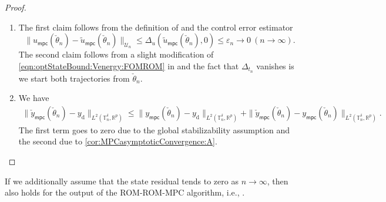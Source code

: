 \documentclass[reqno]{amsart}
\newcommand{\U}{{\mathscr U}}
\newcommand{\R}{\mathbb R}
\newcommand{\timeInt}{\mathbb{T}}
\newcommand{\state}{\theta}
\newcommand{\desired}[1]{#1_{\mathrm{d}}}
\newcommand{\inpVar}{u}
\newcommand{\outVar}{y}
\newcommand{\outVarDes}{\desired{y}}
\newcommand{\outVarDim}{p}
\newcommand{\initBound}{\initBoundn{n}}%
\newcommand{\initBoundn}[1]{\Delta_{t_{#1}}}
\newcommand{\inpVarMPC}{\inpVar_{\mathsf{mpc}}}
\newcommand{\outVarMPC}{\outVar_{\mathsf{mpc}}}
\newcommand{\reduce}[1]{\tilde{#1}}
\newcommand{\inpVarRed}{\reduce{\inpVar}}
\newcommand{\intermediateState}{\check{\state}}
\newcommand{\intermediateOutVarMPC}
{\check{\outVar}_{\mathsf{mpc}}}
\newcommand{\inpVarRedMPC}{\inpVarRed_{\mathsf{mpc}}}
\newcommand{\abbr}[1]{\textsf{#1}\xspace}
\newcommand{\ROM}{\abbr{ROM}}
\newcommand{\MPC}{\abbr{MPC}}
\begin{document}
\begin{proof}\, 
    \begin{enumerate}
        \item The first claim follows from the definition of  and the control error estimator
        \begin{equation}\nonumber
            \|\inpVarMPC(\intermediateState_n)-\inpVarRedMPC(\intermediateState_n)\|_{\U_n} \leq \Delta_u(\inpVarRedMPC(\intermediateState_n),0)\leq \varepsilon_n \to 0 \ (n\to \infty).
        \end{equation}
        The second claim follows from a slight modification of \eqref{eqn:optStateBound:Venergy:FOMROM} in  and the fact that $\initBound$ vanishes is we start both trajectories from $\intermediateState_n$.
        \item We have
        \begin{align}\nonumber
            \|\intermediateOutVarMPC
        (\intermediateState_n)-\outVarDes\|_{L^2(\timeInt_n^\delta,\R^{\outVarDim})} \leq \|\outVarMPC
        (\intermediateState_n)-\outVarDes\|_{L^2(\timeInt_n^\delta,\R^{\outVarDim})}+\|\intermediateOutVarMPC
        (\intermediateState_n)-\outVarMPC
(\intermediateState_n)\|_{L^2(\timeInt_n^\delta,\R^{\outVarDim})}.
        \end{align}
        The first term goes to zero due to the global stabilizability assumption and the second due to \ref{cor:MPCasymptoticConvergence:A}.
    \end{enumerate}
\end{proof}
%
\begin{remark}
    If we additionally assume that the state residual tends to zero as $n\to\infty$, then  also holds for the output of the \ROM-\ROM-\MPC algorithm, i.e., .
\end{remark}
%
\end{document}
